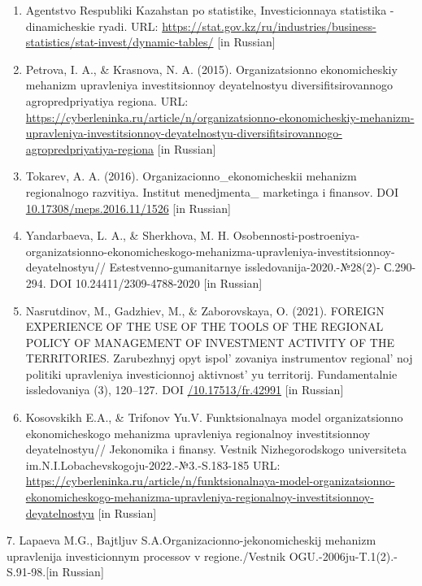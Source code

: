 \begin{enumerate}
\def\labelenumi{\arabic{enumi}.}
\item
  Agentstvo Respubliki Kazahstan po statistike, Investicionnaya
  statistika - dinamicheskie ryadi. URL:
  \url{https://stat.gov.kz/ru/industries/business-statistics/stat-invest/dynamic-tables/}
  {[}in Russian{]}
\item
  Petrova, I. A., \& Krasnova, N. A. (2015). Organizatsionno
  ekonomicheskiy mehanizm upravleniya investitsionnoy deyatelnostyu
  diversifitsirovannogo agropredpriyatiya regiona. URL:
  \url{https://cyberleninka.ru/article/n/organizatsionno-ekonomicheskiy-mehanizm-upravleniya-investitsionnoy-deyatelnostyu-diversifitsirovannogo-agropredpriyatiya-regiona}
  {[}in Russian{]}
\item
  Tokarev, A. A. (2016). Organizacionno\_ekonomicheskii mehanizm
  regionalnogo razvitiya. Institut menedjmenta\_ marketinga i finansov.
  DOI
  \href{https://doi.org/10.17308/meps.2016.11/1526}{10.17308/meps.2016.11/1526}
  {[}in Russian{]}
\item
  Yandarbaeva, L. A., \& Sherkhova, M. H.
  Osobennosti-postroeniya-organizatsionno-ekonomicheskogo-mehanizma-upravleniya-investitsionnoy-deyatelnostyu//
  Estestvenno-gumanitarnye issledovanija-2020.-№28(2)- С.290-294. DOI
  10.24411/2309-4788-2020 {[}in Russian{]}
\item
  Nasrutdinov, M., Gadzhiev, M., \& Zaborovskaya, O. (2021). FOREIGN
  EXPERIENCE OF THE USE OF THE TOOLS OF THE REGIONAL POLICY OF
  MANAGEMENT OF INVESTMENT ACTIVITY OF THE TERRITORIES. Zarubezhnyj opyt
  ispol' zovaniya instrumentov
  regional' noj politiki upravleniya investicionnoj
  aktivnost' yu territorij. Fundamentalnie issledovaniya
  (3), 120--127. DOI
  \href{https://doi.org/10.17513/fr.42991}{/10.17513/fr.42991} {[}in
  Russian{]}
\item
  Kosovskikh E.A., \& Trifonov Yu.V. Funktsionalnaya model
  organizatsionno ekonomicheskogo mehanizma upravleniya regionalnoy
  investitsionnoy deyatelnostyu// Jekonomika i finansy. Vestnik
  Nizhegorodskogo universiteta
  im.N.I.Lobachevskogoju-2022.-№3.-S.183-185 URL:
  \url{https://cyberleninka.ru/article/n/funktsionalnaya-model-organizatsionno-ekonomicheskogo-mehanizma-upravleniya-regionalnoy-investitsionnoy-deyatelnostyu}
  {[}in Russian{]}
\end{enumerate}

7. Lapaeva M.G., Bajtljuv S.A.Organizacionno-jekonomicheskij mehanizm
upravlenija investicionnym processov v regione./Vestnik
OGU.-2006ju-T.1(2).-S.91-98.{[}in Russian{]}

